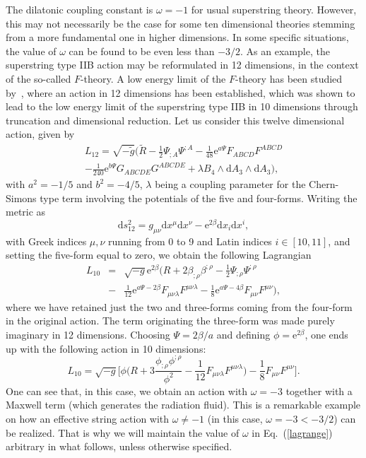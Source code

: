 \documentclass[a4paper,aps,twocolumn,prd,showpacs,nofootinbib]{revtex4}
\newcommand{\dd}{\mathrm{d}}
\newcommand{\ee}{\mathrm{e}}
\newcommand{\si}{\scriptscriptstyle}
\begin{document}
The dilatonic coupling constant is $\omega = - 1$ for usual
superstring theory. However, this may not necessarily be the case for
some ten dimensional theories stemming from a more fundamental one in
higher dimensions. In some specific situations, the value of $\omega$
can be found to be even less than $-3/2$.  As an example, the
superstring type IIB action may be reformulated in 12 dimensions, in
the context of the so-called $F$-theory. A low energy limit of the
$F$-theory has been studied by~\cite{pope}, where an action in 12
dimensions has been established, which was shown to lead to the low
energy limit of the superstring type IIB in 10 dimensions through
truncation and dimensional reduction. Let us consider this twelve
dimensional action, given by~\cite{pope}
\begin{eqnarray}
L_{12} = \sqrt{-\tilde g}\biggl(\tilde R -
\frac{1}{2}\Psi_{;\si{A}}\Psi^{;\si{A}} -
\frac{1}{48}\ee^{a\Psi}F_{\si{ABCD}}F^{\si{ABCD}} \nonumber \\
-\frac{1}{240}\ee^{b\Psi}G_{\si{ABCDE}}G^{\si{ABCDE}} + \lambda
B_4{\scriptstyle \wedge} \dd A_3{\scriptstyle \wedge} \dd A_3\biggr),
\label{f12}
\end{eqnarray}
with $a^2 = - 1/5$ and $b^2 = - 4/5$, $\lambda$ being a coupling
parameter for the Chern-Simons type term involving the potentials of
the five and four-forms. Writing the metric as
\begin{equation}
\dd s_{12}^2 = g_{\mu\nu}\dd x^\mu \dd x^\nu - \ee^{2\beta}\dd x_i \dd
x^i ,
\end{equation}
with Greek indices $\mu, \nu$ running from 0 to 9 and Latin indices
$i\in [10,11]$, and setting the five-form equal to zero, we obtain the
following Lagrangian
\begin{eqnarray}
L_{10} & = & \sqrt{-g}\ee^{2\beta}\biggr(R +
2\beta_{;\rho}\beta^{;\rho} - \frac{1}{2}\Psi_{;\rho}\Psi^{;\rho}
\nonumber \\ &- &\frac{1}{12}\ee^{a\Psi - 2\beta}
F_{\mu\nu\lambda}F^{\mu\nu\lambda} - \frac{1}{8}\ee^{a\Psi -
4\beta}F_{\mu\nu}F^{\mu\nu}\biggl),
\end{eqnarray}
where we have retained just the two and three-forms coming from the
four-form in the original action. The term originating the three-form
was made purely imaginary in 12 dimensions. Choosing $\Psi = 2\beta/a$
and defining $\phi = \ee^{2\beta}$, one ends up with the following
action in 10 dimensions:
\begin{equation}
L_{10} = \sqrt{-g}\biggl[\phi\biggl(R +
3\frac{\phi_{;\rho}\phi^{;\rho}}{\phi^2} -
\frac{1}{12}F_{\mu\nu\lambda}F^{\mu\nu\lambda}\biggl) -
\frac{1}{8}F_{\mu\nu}F^{\mu\nu}\biggr]\label{f10}.
\end{equation}
One can see that, in this case, we obtain an action with $\omega = -
3$ together with a Maxwell term (which generates the radiation
fluid). This is a remarkable example on how an effective string action
with $\omega \neq -1$ (in this case, $\omega = -3 < -3/2$) can be
realized. That is why we will maintain the value of $\omega$ in
Eq.~(\ref{lagrange}) arbitrary in what follows, unless otherwise
specified.
\end{document}
